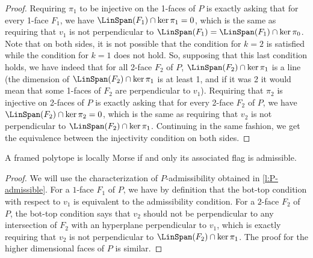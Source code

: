 \begin{proof}
	Requiring $\pi_1$ to be injective on the 1-faces of $P$ is exactly asking that for every 1-face $F_1$, we have $\LinSpan(F_1)\cap \ker \pi_1=0$, which is the same as requiring that $v_1$ is not perpendicular to $\LinSpan(F_1)=\LinSpan(F_1)\cap \ker \pi_0$.
	Note that on both sides, it is not possible that the condition for $k=2$ is satisfied while the condition for $k=1$ does not hold.
	So, supposing that this last condition holds, we have indeed that for all 2-face $F_2$ of $P$, $\LinSpan(F_2)\cap \ker \pi_1$ is a line (the dimension of $\LinSpan(F_2)\cap \ker \pi_1$ is at least 1, and if it was 2 it would mean that some 1-faces of $F_2$ are perpendicular to $v_1$).
	Requiring that $\pi_2$ is injective on 2-faces of $P$ is exactly asking that for every 2-face $F_2$ of $P$, we have $\LinSpan(F_2)\cap \ker \pi_2=0$, which is the same as requiring that $v_2$ is not perpendicular to $\LinSpan(F_2)\cap \ker \pi_1$.
	Continuing in the same fashion, we get the equivalence between the injectivity condition on both sides.
\end{proof}

\begin{lemma} \label{l:bot-top-admissible}
	A framed polytope is locally Morse if and only its associated flag is admissible.
\end{lemma}

\begin{proof}
	We will use the characterization of $P$-admissibility obtained in \cref{l:P-admissible}.
	For a $1$-face $F_1$ of $P$, we have by definition that the bot-top condition with respect to $v_1$ is equivalent to the admissibility condition.
	For a $2$-face $F_2$ of $P$, the bot-top condition says that $v_2$ should not be perpendicular to any intersection of $F_2$ with an hyperplane perpendicular to $v_1$, which is exactly requiring that $v_2$ is not perpendicular to $\LinSpan(F_2)\cap \ker \pi_1$.
	The proof for the higher dimensional faces of $P$ is similar.
\end{proof}

